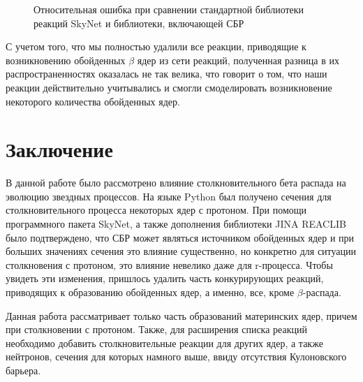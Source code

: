 \documentclass[%
master,    %
natbib,      %
subf,        %
href,        %
colorlinks,  %
]{disser}
\begin{document}
\begin{figure}[h]
	\caption{Относительная ошибка при сравнении стандартной библиотеки реакций SkyNet и библиотеки, включающей СБР}
	\label{ris:result-err}
\end{figure}

С учетом того, что мы полностью удалили все реакции, приводящие к возникновению обойденных $\beta$ ядер из сети реакций, полученная разница в их распространенностях оказалась не так велика, что говорит о том, что наши реакции действительно учитывались и смогли смоделировать возникновение некоторого количества обойденных ядер.

\section{Заключение}

В данной работе было рассмотрено влияние столкновительного бета распада на эволюцию звездных процессов. На языке Python был получено сечения для столкновительного процесса некоторых ядер с протоном. При помощи программного пакета SkyNet, а также дополнения библиотеки JINA REACLIB было подтверждено, что СБР может являться источником обойденных ядер и при больших значениях сечения это влияние существенно, но конкретно для ситуации столкновения с протоном, это влияние невелико даже для r-процесса. Чтобы увидеть эти изменения, пришлось удалить часть конкурирующих реакций, приводящих к образованию обойденных ядер, а именно, все, кроме $\beta$-распада.  

Данная работа рассматривает только часть образований материнских ядер, причем при столкновении с протоном. Также, для расширения списка реакций необходимо добавить столкновительные реакции для других ядер, а также нейтронов, сечения для которых намного выше, ввиду отсутствия Кулоновского барьера.



\end{document}
